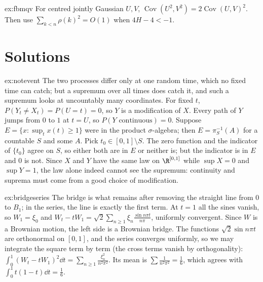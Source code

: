 \begin{hint}{ex:fbmqv}
For centred jointly Gaussian $U,V$, $\operatorname{Cov}(U^2,V^2)=2\operatorname{Cov}(U,V)^2$. Then use $\sum_{k<n}\rho(k)^2=O(1)$ when $4H-4<-1$.
\end{hint}

\section{Solutions}

\begin{solution}{ex:notevent}
\idea The two processes differ only at one random time, which no fixed time can catch; but a supremum over all times does catch it, and such a supremum looks at uncountably many coordinates.
\writeup For fixed $t$, $P(Y_t\neq X_t)=P(U=t)=0$, so $Y$ is a modification of $X$. Every path of $Y$ jumps from $0$ to $1$ at $t=U$, so $P(Y\text{ continuous})=0$. Suppose
$E=\{x:\sup_tx(t)\ge1\}$ were in the product $\sigma$-algebra; then $E=\pi_S^{-1}(A)$ for a countable $S$ and some $A$. Pick $t_0\in[0,1]\setminus S$. The zero function and the indicator of $\{t_0\}$ agree on $S$, so
either both are in $E$ or neither is; but the indicator is in $E$ and $0$ is not. Since $X$ and $Y$ have the same law on $\R^{[0,1]}$ while $\sup X=0$ and $\sup Y=1$, the law alone indeed cannot see the supremum: continuity and
suprema must come from a good choice of modification.
\end{solution}

\begin{solution}{ex:bridgeseries}
\idea The bridge is what remains after removing the straight line from $0$ to $B_1$; in the series, the line is exactly the first term.
\writeup At $t=1$ all the sines vanish, so $W_1=\xi_0$ and $W_t-tW_1=\sqrt2\sum_{n\ge1}\xi_n\frac{\sin n\pi t}{n\pi}$, uniformly convergent. Since $W$ is a Brownian motion, the left side is a Brownian bridge. The functions
$\sqrt2\sin n\pi t$ are orthonormal on $[0,1]$, and the series converges uniformly, so we may integrate the square term by term (the cross terms vanish by orthogonality):
$\int_0^1(W_t-tW_1)^2\dd t=\sum_{n\ge1}\frac{\xi_n^2}{n^2\pi^2}$. Its mean is $\sum\frac1{n^2\pi^2}=\frac16$, which agrees with $\int_0^1t(1-t)\dd t=\frac16$.
\end{solution}

